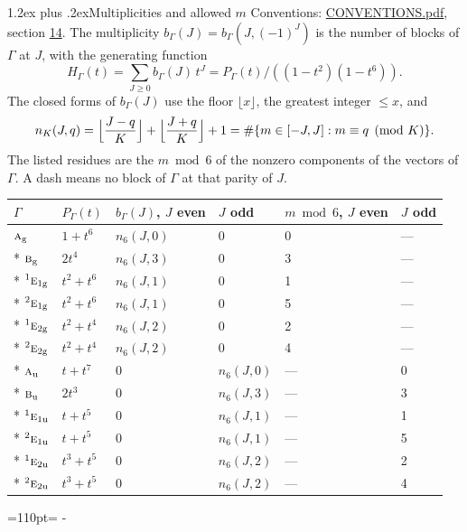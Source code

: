 \documentclass[10pt,a4paper]{article}
\makeatletter
\renewcommand\section{\@startsection{section}{1}{\z@}{-3ex plus -1ex minus -.2ex}%
  {1.2ex plus .2ex}{\normalfont\large\sffamily\bfseries\color{parttitle}}}
\newcommand{\needspace}[1]{\par\penalty-100\begingroup\dimen0=#1\relax\dimen2=\pagegoal
  \advance\dimen2-\pagetotal\ifdim\dimen0>\dimen2\relax\ifdim\dimen2>0pt\vfil\break\fi\fi
  \endgroup}
\numberwithin{equation}{section}
\newcommand{\irr}[1]{\text{\normalfont\scshape #1}}
\newcommand{\conjpair}[1]{{}^{#1}}
\newcommand{\ptag}[1]{\mathrm{#1}}
\makeatother
\begin{document}
\section{Multiplicities and allowed \texorpdfstring{$m$}{m}}\label{s:multiplicities}
Conventions: \href{../../CONVENTIONS.pdf}{CONVENTIONS.pdf}, section \href{../../CONVENTIONS.pdf\#conv.14}{14}.
\leavevmode\label{n:function.generating}\label{n:index.generating.variable}\label{n:function.generating.numerator}The multiplicity $b_\Gamma(J) = b_\Gamma(J, (-1)^J)$ is the number of blocks of $\Gamma$ at $J$, with the generating function
\begin{equation}\label{e:gf}H_\Gamma(t) = \sum_{J\ge0} b_\Gamma(J)\,t^J = P_\Gamma(t)/((1-t^{2})(1-t^{6})).\end{equation}
\leavevmode\label{n:delimiter.floor}\label{n:local.floor.x}\label{n:function.count}\label{n:index.modulus.K}\label{n:index.residue}The closed forms of $b_\Gamma(J)$ use the floor $\lfloor x\rfloor$, the greatest integer $\le x$, and
\begin{equation}\label{e:count}n_K(J,q) = \Bigl\lfloor\frac{J-q}{K}\Bigr\rfloor + \Bigl\lfloor\frac{J+q}{K}\Bigr\rfloor + 1 = \#\{m\in[-J,J] : m\equiv q \pmod{K}\}.\end{equation}
\leavevmode\label{n:head.parity}The listed residues are the $m \bmod 6$ of the nonzero components of the vectors of $\Gamma$. A dash means no block of $\Gamma$ at that parity of $J$.
{\small\begin{longtable}{@{}llllll@{}}\toprule
$\Gamma$ & $P_\Gamma(t)$ & $b_\Gamma(J)$, $J$ even & $J$ odd & $m \bmod 6$, $J$ even & $J$ odd\\\midrule\endhead
\bottomrule\endfoot\endlastfoot
$\irr{a}_{\ptag{g}}$ & $1 + t^{6}$ & $n_{6}(J,0)$ & $0$ & 0 & ---\\*
$\irr{b}_{\ptag{g}}$ & $2t^{4}$ & $n_{6}(J,3)$ & $0$ & 3 & ---\\*
$\conjpair{1}\irr{e}_{1\ptag{g}}$ & $t^{2} + t^{6}$ & $n_{6}(J,1)$ & $0$ & 1 & ---\\*
$\conjpair{2}\irr{e}_{1\ptag{g}}$ & $t^{2} + t^{6}$ & $n_{6}(J,1)$ & $0$ & 5 & ---\\*
$\conjpair{1}\irr{e}_{2\ptag{g}}$ & $t^{2} + t^{4}$ & $n_{6}(J,2)$ & $0$ & 2 & ---\\*
$\conjpair{2}\irr{e}_{2\ptag{g}}$ & $t^{2} + t^{4}$ & $n_{6}(J,2)$ & $0$ & 4 & ---\\*
$\irr{a}_{\ptag{u}}$ & $t + t^{7}$ & $0$ & $n_{6}(J,0)$ & --- & 0\\*
$\irr{b}_{\ptag{u}}$ & $2t^{3}$ & $0$ & $n_{6}(J,3)$ & --- & 3\\*
$\conjpair{1}\irr{e}_{1\ptag{u}}$ & $t + t^{5}$ & $0$ & $n_{6}(J,1)$ & --- & 1\\*
$\conjpair{2}\irr{e}_{1\ptag{u}}$ & $t + t^{5}$ & $0$ & $n_{6}(J,1)$ & --- & 5\\*
$\conjpair{1}\irr{e}_{2\ptag{u}}$ & $t^{3} + t^{5}$ & $0$ & $n_{6}(J,2)$ & --- & 2\\*
$\conjpair{2}\irr{e}_{2\ptag{u}}$ & $t^{3} + t^{5}$ & $0$ & $n_{6}(J,2)$ & --- & 4\\
\bottomrule\end{longtable}}
\needspace{110pt}
\end{document}

